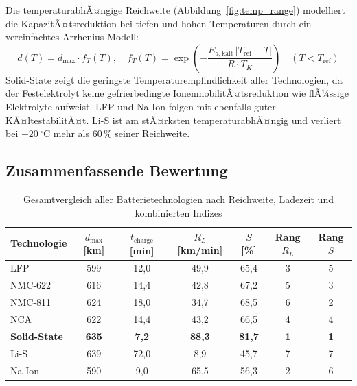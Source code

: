 ﻿\documentclass[12pt,a4paper]{article}
\begin{document}
	Die temperaturabhÃ¤ngige Reichweite (Abbildung~\ref{fig:temp_range})
	modelliert die KapazitÃ¤tsreduktion bei tiefen und hohen Temperaturen
	durch ein vereinfachtes Arrhenius-Modell:
	\begin{equation}
		d(T) = d_{\mathrm{max}} \cdot f_T(T),\quad
		f_T(T) = \exp\!\left(-\frac{E_{a,\mathrm{kalt}} \,|T_{\mathrm{ref}}-T|}{R \cdot T_K}\right)
		\quad (T < T_{\mathrm{ref}})
		\label{eq:temp_range}
	\end{equation}
	Solid-State zeigt die geringste Temperaturempfindlichkeit aller
	Technologien, da der Festelektrolyt keine gefrierbedingte
	IonenmobilitÃ¤tsreduktion wie flÃ¼ssige Elektrolyte aufweist. LFP
	und Na-Ion folgen mit ebenfalls guter KÃ¤ltestabilitÃ¤t. Li-S
	ist am stÃ¤rksten temperaturabhÃ¤ngig und verliert bei
	$-20\,^\circ\mathrm{C}$ mehr als $60\,\%$ seiner Reichweite.

	\subsection{Zusammenfassende Bewertung}

	\begin{table}[H]
		\centering
		\caption{Gesamtvergleich aller Batterietechnologien nach Reichweite,
		         Ladezeit und kombinierten Indizes}
		\label{tab:summary_tech}
		\begin{tabular}{lcccccc}
			\toprule
			\textbf{Technologie} &
			$d_{\mathrm{max}}$ [km] &
			$t_{\mathrm{charge}}$ [min] &
			$R_L$ [km/min] &
			$S$ [\%] &
			Rang $R_L$ &
			Rang $S$ \\
			\midrule
			LFP         & 599  & 12{,}0 & 49{,}9 & 65{,}4 & 3 & 5 \\
			NMC-622     & 616  & 14{,}4 & 42{,}8 & 67{,}2 & 5 & 3 \\
			NMC-811     & 624  & 18{,}0 & 34{,}7 & 68{,}5 & 6 & 2 \\
			NCA         & 622  & 14{,}4 & 43{,}2 & 66{,}5 & 4 & 4 \\
			\textbf{Solid-State} & \textbf{635} & \textbf{7{,}2} &
			\textbf{88{,}3} & \textbf{81{,}7} & \textbf{1} & \textbf{1} \\
			Li-S        & 639  & 72{,}0 & \phantom{0}8{,}9 & 45{,}7 & 7 & 7 \\
			Na-Ion      & 590  & \phantom{0}9{,}0 & 65{,}5 & 56{,}3 & 2 & 6 \\
			\bottomrule
		\end{tabular}
	\end{table}
\end{document}
